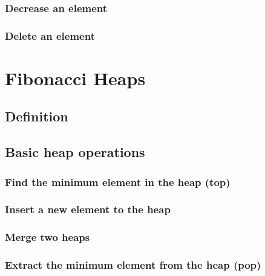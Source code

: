 \documentclass{article}
\begin{document}
\subsubsection{Decrease an element}

\subsubsection{Delete an element}

\section{Fibonacci Heaps}
\label{fib-heap}

\subsection{Definition}

\subsection{Basic heap operations}

\subsubsection{Find the minimum element in the heap (top)}

\subsubsection{Insert a new element to the heap}

\subsubsection{Merge two heaps}

\subsubsection{Extract the minimum element from the heap (pop)}
\end{document}
